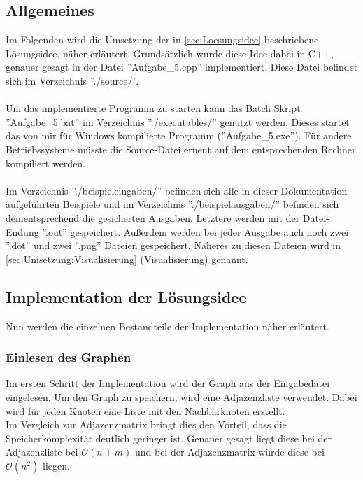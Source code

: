 \documentclass[a4paper,10pt,ngerman]{scrartcl}
\begin{document}
    \subsection{Allgemeines}
      Im Folgenden wird die Umsetzung der in \cref{sec:Loesungsidee} beschriebene Lösungsidee, näher erläutert.  Grundsätzlich wurde diese Idee dabei in C++, genauer gesagt in der Datei ''Aufgabe\_5.cpp'' implementiert. Diese Datei befindet sich im Verzeichnis ''./source/''.
      \\\\
      Um das implementierte Programm zu starten kann das Batch Skript ''Aufgabe\_5.bat'' im Verzeichnis ''./executables/'' genutzt werden. Dieses startet das von mir für Windows kompilierte Programm (''Aufgabe\_5.exe''). Für andere Betriebssysteme müsste die Source-Datei erneut auf dem entsprechenden Rechner kompiliert werden.
      \\\\
      Im Verzeichnis ''./beispieleingaben/'' befinden sich alle in dieser Dokumentation aufgeführten Beispiele und im Verzeichnis ''./beispielausgaben/'' befinden sich dementsprechend die gesicherten Ausgaben.
      Letztere werden mit der Datei-Endung ''.out'' gespeichert. Außerdem werden bei jeder Ausgabe auch noch zwei ''.dot'' und zwei ''.png'' Dateien gespeichert. Näheres zu diesen Dateien wird in \cref{sec:Umsetzung:Visualisierung} (Visualisierung) genannt.

    \subsection{Implementation der Lösungsidee}
      Nun werden die einzelnen Bestandteile der Implementation näher erläutert.
      \subsubsection{Einlesen des Graphen}
        Im ersten Schritt der Implementation wird der Graph aus der Eingabedatei eingelesen. Um den Graph zu speichern, wird eine Adjazenzliste verwendet. Dabei wird für jeden Knoten eine Liste mit den Nachbarknoten erstellt.\\
        Im Vergleich zur Adjazenzmatrix bringt dies den Vorteil, dass die Speicherkomplexität deutlich geringer ist. Genauer gesagt liegt diese bei der Adjazenzliste bei $\mathcal{O}(n + m)$ und bei der Adjazenzmatrix würde diese bei $\mathcal{O}(n^2)$ liegen.
\end{document}
